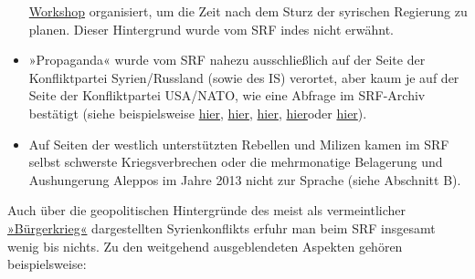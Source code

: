 \begin{itemize}
  \href{http://www.zeit.de/2012/31/Syrien-Bundesregierung}{Workshop}
  organisiert, um die Zeit nach dem Sturz der syrischen Regierung zu
  planen. Dieser Hintergrund wurde vom SRF indes nicht erwähnt.
\item
  »Propaganda« wurde vom SRF nahezu ausschließlich auf der Seite der
  Konfliktpartei Syrien/Russland (sowie des IS) verortet, aber kaum je
  auf der Seite der Konfliktpartei USA/NATO, wie eine Abfrage im
  SRF-Archiv bestätigt (siehe beispielsweise
  \href{http://m.srf.ch/news/international/wie-sich-russland-inszeniert-auch-in-syrien}{hier},
  \href{http://www.srf.ch/play/tv/10vor10/video/fokus-russischer-propaganda-einsatz-in-syrien?id=398bb4e7-b6ad-4df1-bfe4-798b40592d1a}{hier},
  \href{https://www.srf.ch/news/international/wahlen-in-einem-zerrissenen-land}{hier},
  \href{http://www.srf.ch/news/amp/article/1644822}{hier}oder
  \href{http://www.srf.ch/news/international/mittelfristig-sieht-es-schlecht-aus-fuer-assad}{hier}).
\item
  Auf Seiten der westlich unterstützten Rebellen und Milizen kamen im
  SRF selbst schwerste Kriegsverbrechen oder die mehrmonatige Belagerung
  und Aushungerung Aleppos im Jahre 2013 nicht zur Sprache (siehe
  Abschnitt B).
\end{itemize}

Auch über die geopolitischen Hintergründe des meist als vermeintlicher
\href{https://www.srf.ch/news/international/kriegsverbrechen-in-syrien-aerzte-und-pfleger-als-zielscheibe}{»Bürgerkrieg«}
dargestellten Syrienkonflikts erfuhr man beim SRF insgesamt wenig bis
nichts. Zu den weitgehend ausgeblendeten Aspekten gehören
beispielsweise:

